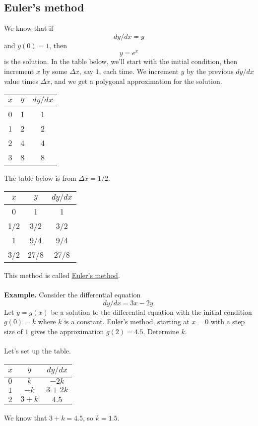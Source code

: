\documentclass[11pt, oneside]{article}   	%
\begin{document}
\subsection{Euler's method}
We know that if 
$$
dy/dx = y
$$ and $y(0) = 1$, then
$$
y = e^x
$$
is the solution. In the table below, we'll start with the initial condition, then increment $x$ by some $\Delta x$, say $1$, each time. We increment $y$ by the previous $dy/dx$ value times $\Delta x$, and we get a polygonal approximation for the solution.
\begin{center} 
\begin{tabular}{|c |c |c|} 
\hline
$x$ & $y$ & $dy/dx$\\ 
\hline
0 & 1 & 1 \\ 
\hline
1 & 2 & 2  \\
\hline
2 & 4 & 4\\
\hline
3 & 8 & 8 \\
\hline
\end{tabular}
\end{center}
The table below is from $\Delta x = 1/2$.
\begin{center}
\begin{tabular}{|c |c |c|} 
\hline
$x$ & $y$ & $dy/dx$\\ 
\hline
0 & 1 & 1 \\ 
\hline
1/2 & 3/2 & 3/2  \\
\hline
1 & 9/4 & 9/4\\
\hline
3/2 & 27/8 & 27/8\\
\hline
\end{tabular}
\end{center}
This method is called \underline{Euler's method}.\\\\
\textbf{Example.} Consider the differential equation
$$
dy/dx = 3x - 2y.
$$
Let $y=g(x)$ be a solution to the differential equation with the initial condition $g(0) = k$ where $k$ is a constant. Euler's method, starting at $x=0$ with a step size of $1$ gives the approximation $g(2) = 4.5$. Determine $k$. \\\\
Let's set up the table.
\begin{center}
\begin{tabular}{|c |c |c|} 
\hline
$x$ & $y$ & $dy/dx$\\ 
\hline
$0$ & $k$ & $-2k$ \\ 
\hline
$1$ & $-k$ & $3+2k$  \\
\hline
$2$ &  $3 + k$ & $4.5$\\
\hline
\end{tabular}
\end{center}
We know that $3+k = 4.5$, so $k=1.5$.
\end{document}
